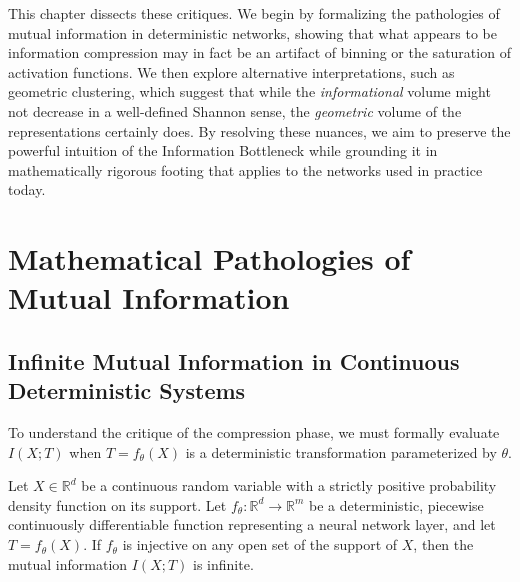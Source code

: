This chapter dissects these critiques. We begin by formalizing the pathologies of mutual information in deterministic networks, showing that what appears to be information compression may in fact be an artifact of binning or the saturation of activation functions. We then explore alternative interpretations, such as geometric clustering, which suggest that while the \emph{informational} volume might not decrease in a well-defined Shannon sense, the \emph{geometric} volume of the representations certainly does. By resolving these nuances, we aim to preserve the powerful intuition of the Information Bottleneck while grounding it in mathematically rigorous footing that applies to the networks used in practice today.

\section{Mathematical Pathologies of Mutual Information}

\subsection{Infinite Mutual Information in Continuous Deterministic Systems}

To understand the critique of the compression phase, we must formally evaluate $I(X; T)$ when $T = f_\theta(X)$ is a deterministic transformation parameterized by $\theta$.

\begin{theorem}
\label{thm:infinite_mi}
Let $X \in \mathbb{R}^d$ be a continuous random variable with a strictly positive probability density function on its support. Let $f_\theta: \mathbb{R}^d \to \mathbb{R}^m$ be a deterministic, piecewise continuously differentiable function representing a neural network layer, and let $T = f_\theta(X)$. If $f_\theta$ is injective on any open set of the support of $X$, then the mutual information $I(X; T)$ is infinite.
\end{theorem}

